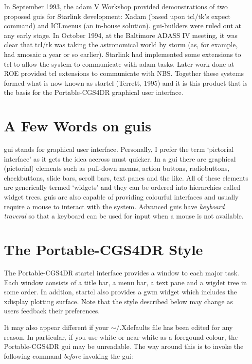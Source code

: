 \documentclass[a4paper]{book}
\renewcommand{\_}{{\tt\char'137}}
\begin{document}
In September 1993, the {\sc adam} V Workshop provided demonstrations of two
proposed {\sc gui}s for Starlink development: Xadam (based upon tcl/tk's expect
command) and ICLmenus (an in-house solution). {\sc gui}-builders were ruled out
at any early stage. In October 1994, at the Baltimore ADASS IV meeting, it
was clear that tcl/tk was taking the astronomical world by storm (as, for
example, had xmosaic a year or so earlier). Starlink had implemented some
extensions to tcl to allow the system to communicate with {\sc adam} tasks.
Later work done at ROE provided tcl extensions to communicate with NBS.
Together these systems formed what is now known as {\sc startcl} (Terrett, 1995)
and it is this product that is the basis for the Portable-CGS4DR graphical
user interface.

\section{A Few Words on {\sc gui}s}
{\sc gui} stands for graphical user interface. Personally, I prefer the term
`pictorial interface' as it gets the idea accross must quicker. In a {\sc gui}
there are graphical (pictorial) elements such as pull-down menus, action
buttons, radiobuttons, checkbuttons, slide bars, scroll bars, text panes
and the like. All of these elements are generically termed `widgets' and
they can be ordered into hierarchies called widget trees. {\sc gui}s are also
capable of providing colourful interfaces and usually require a mouse to
interact with the system. Advanced {\sc gui}s have {\em keyboard traveral} so
that a keyboard can be used for input when a mouse is not available.

\section{The Portable-CGS4DR Style}
The Portable-CGS4DR {\sc startcl} interface provides a window to each major
task. Each window consists of a title bar, a menu bar, a text pane and a
wigdet tree in some order. In addtion, {\sc startcl} also provides a {\sc gwm} widget
which includes the xdisplay plotting surface. Note that the style described
below may change as users feedback their preferences.

It may also appear different if your $\sim$/.Xdefaults file has been edited for any reason.
In particular, if you use white or near-white as a foregound colour, the Portable-CGS4DR
{\sc gui} may be unreadable. The way around this is to invoke the following command
{\em before} invoking the {\sc gui}:
\end{document}
